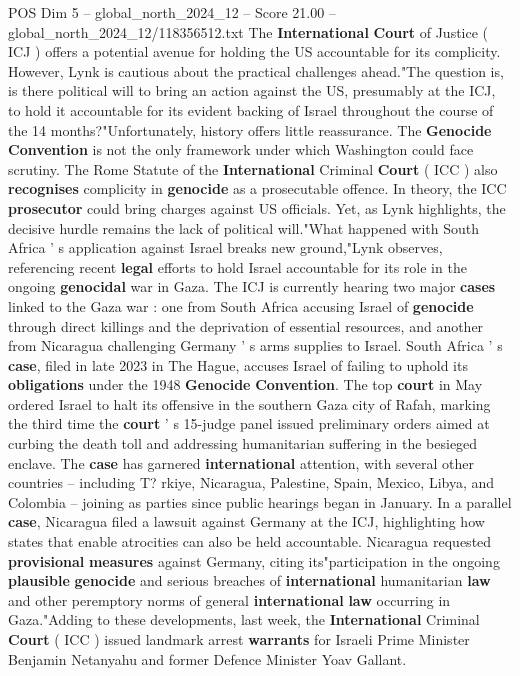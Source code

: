 \begin{textsample}{POS Dim 5 – global\_north\_2024\_12 – Score 21.00 – global\_north\_2024\_12/118356512.txt}
The \textbf{International} \textbf{Court} of Justice ( ICJ ) offers a potential avenue for holding the US accountable for its complicity.
However, Lynk is cautious about the practical challenges ahead."The question is, is there political will to bring an action against the US, presumably at the ICJ, to hold it accountable for its evident backing of Israel throughout the course of the 14 months?"Unfortunately, history offers little reassurance.
The \textbf{Genocide} \textbf{Convention} is not the only framework under which Washington could face scrutiny.
The Rome Statute of the \textbf{International} Criminal \textbf{Court} ( ICC ) also \textbf{recognises} complicity in \textbf{genocide} as a prosecutable offence.
In theory, the ICC \textbf{prosecutor} could bring charges against US officials.
Yet, as Lynk highlights, the decisive hurdle remains the lack of political will."What happened with South Africa ' s application against Israel breaks new ground,"Lynk observes, referencing recent \textbf{legal} efforts to hold Israel accountable for its role in the ongoing \textbf{genocidal} war in Gaza.
The ICJ is currently hearing two major \textbf{cases} linked to the Gaza war : one from South Africa accusing Israel of \textbf{genocide} through direct killings and the deprivation of essential resources, and another from Nicaragua challenging Germany ' s arms supplies to Israel.
South Africa ' s \textbf{case}, filed in late 2023 in The Hague, accuses Israel of failing to uphold its \textbf{obligations} under the 1948 \textbf{Genocide} \textbf{Convention}.
The top \textbf{court} in May ordered Israel to halt its offensive in the southern Gaza city of Rafah, marking the third time the \textbf{court} ' s 15-judge panel issued preliminary orders aimed at curbing the death toll and addressing humanitarian suffering in the besieged enclave.
The \textbf{case} has garnered \textbf{international} attention, with several other countries -- including T? rkiye, Nicaragua, Palestine, Spain, Mexico, Libya, and Colombia -- joining as parties since public hearings began in January.
In a parallel \textbf{case}, Nicaragua filed a lawsuit against Germany at the ICJ, highlighting how states that enable atrocities can also be held accountable.
Nicaragua requested \textbf{provisional} \textbf{measures} against Germany, citing its"participation in the ongoing \textbf{plausible} \textbf{genocide} and serious breaches of \textbf{international} humanitarian \textbf{law} and other peremptory norms of general \textbf{international} \textbf{law} occurring in Gaza."Adding to these developments, last week, the \textbf{International} Criminal \textbf{Court} ( ICC ) issued landmark arrest \textbf{warrants} for Israeli Prime Minister Benjamin Netanyahu and former Defence Minister Yoav Gallant.

\end{textsample}

